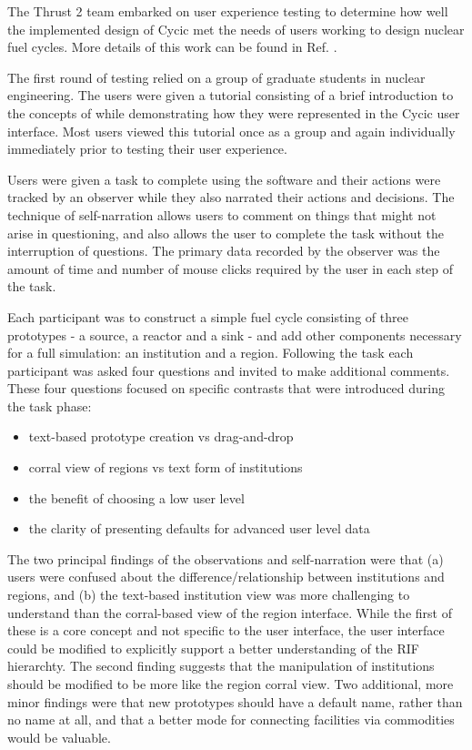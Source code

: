 The Thrust 2 team embarked on user experience testing to determine how well
the implemented design of Cycic met the needs of users working to design
nuclear fuel cycles.  More details of this work can be found in
Ref. .

The first round of testing relied on a group of graduate students in nuclear
engineering.  The users were given a tutorial consisting of a brief
introduction to the concepts of \Cyclus while demonstrating how they were
represented in the Cycic user interface.  Most users viewed this tutorial once
as a group and again individually immediately prior to testing their user
experience.

Users were given a task to complete using the software and their actions were
tracked by an observer while they also narrated their actions and decisions.
The technique of self-narration allows users to comment on things that might
not arise in questioning, and also allows the user to complete the task
without the interruption of questions.  The primary data recorded by the
observer was the amount of time and number of mouse clicks required by the
user in each step of the task.

Each participant was to construct a simple fuel cycle consisting of three
prototypes - a source, a reactor and a sink - and add other components
necessary for a full \Cyclus simulation: an institution and a region.
Following the task each participant was asked four questions and invited to
make additional comments.  These four questions focused on specific contrasts
that were introduced during the task phase:
\begin{itemize}
\item text-based prototype creation vs drag-and-drop
\item corral view of regions vs text form of institutions
\item the benefit of choosing a low user level
\item the clarity of presenting defaults for advanced user level data
\end{itemize}

The two principal findings of the observations and self-narration were that
(a) users were confused about the difference/relationship between institutions
and regions, and (b) the text-based institution view was more challenging to
understand than the corral-based view of the region interface.  While the
first of these is a core \Cyclus concept and not specific to the user
interface, the user interface could be modified to explicitly support a better
understanding of the \gls{RIF} hierarchty.  The second finding suggests that
the manipulation of institutions should be modified to be more like the region
corral view. Two additional, more minor findings were that new prototypes
should have a default name, rather than no name at all, and that a better mode
for connecting facilities via commodities would be valuable.

